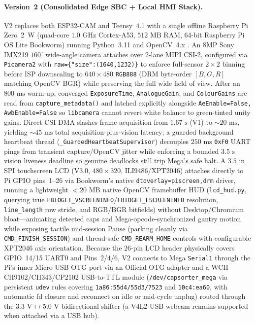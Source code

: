 \documentclass[10pt,twocolumn,letterpaper]{article}
\begin{document}
\paragraph{Version~2 (Consolidated Edge SBC + Local HMI Stack).}
V2 replaces both ESP32-CAM and Teensy~4.1 with a single offline Raspberry Pi Zero~2~W (quad-core $1.0\text{ GHz}$ Cortex-A53, $512\text{ MB}$ RAM, 64-bit Raspberry Pi OS Lite Bookworm) running Python~3.11 and OpenCV~4.x \cite{bradski2000opencv}. An 8MP Sony IMX219 $160^\circ$ wide-angle camera attaches over 2-lane MIPI CSI-2, configured via \texttt{Picamera2} with \texttt{raw=\{"size":(1640,1232)\}} to enforce full-sensor $2\times 2$ binning before ISP downscaling to $640\times 480$ \texttt{RGB888} (DRM byte-order $[B,G,R]$ matching OpenCV BGR) while preserving the full wide field of view. After an $800\text{ ms}$ warm-up, converged \texttt{ExposureTime}, \texttt{AnalogueGain}, and \texttt{ColourGains} are read from \texttt{capture\_metadata()} and latched explicitly alongside \texttt{AeEnable=False, AwbEnable=False} so \texttt{libcamera} cannot revert white balance to green-tinted unity gains. Direct CSI DMA slashes frame acquisition from $1.67\text{ s}$ (V1) to $\sim 20\text{ ms}$, yielding $\sim 45\text{ ms}$ total acquisition-plus-vision latency; a guarded background heartbeat thread (\texttt{\_GuardedHeartbeatSupervisor}) decouples $250\text{ ms}$ \texttt{0xF0} UART pings from transient capture/OpenCV jitter while enforcing a bounded $3.5\text{ s}$ vision liveness deadline so genuine deadlocks still trip Mega's safe halt. A $3.5\text{ in}$ SPI touchscreen LCD (V3.0, $480\times 320$, ILI9486/XPT2046) attaches directly to Pi GPIO pins~1--26 via Bookworm's native \texttt{dtoverlay=piscreen,drm} driver, running a lightweight $<20\text{ MB}$ native OpenCV framebuffer HUD (\texttt{lcd\_hud.py}, querying true \texttt{FBIOGET\_VSCREENINFO}/\texttt{FBIOGET\_FSCREENINFO} resolution, \texttt{line\_length} row stride, and RGB/BGR bitfields) without Desktop/Chromium bloat—animating detected caps and Mega-opcode-synchronized gantry motion while exposing tactile mid-session Pause (parking cleanly via \texttt{CMD\_FINISH\_SESSION}) and thread-safe \texttt{CMD\_REARM\_HOME} controls with configurable XPT2046 axis orientation. Because the 26-pin LCD header physically covers GPIO~14/15 UART0 and Pins~2/4/6, V2 connects to Mega \texttt{Serial1} through the Pi's inner Micro-USB OTG port via an Official OTG adapter and a WCH CH9102/CH343/CP2102 USB-to-TTL module (\texttt{/dev/capsorter\_mega} via persistent \texttt{udev} rules covering \texttt{1a86:55d4/55d3/7523} and \texttt{10c4:ea60}, with automatic fd closure and reconnect on idle or mid-cycle unplug) routed through the $3.3\text{ V}\leftrightarrow 5.0\text{ V}$ bidirectional shifter (a V4L2 USB webcam remains supported when attached via a USB hub).
\end{document}
